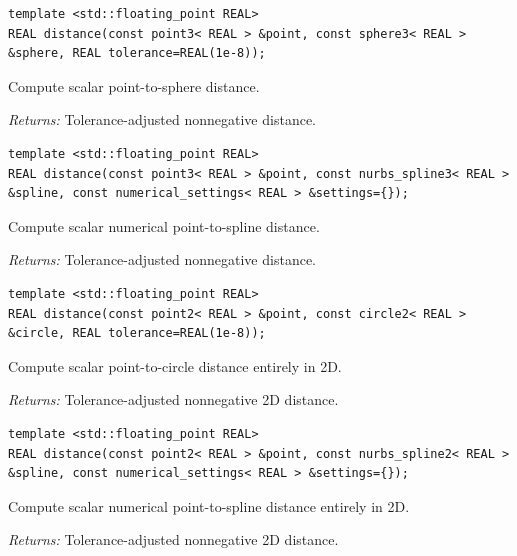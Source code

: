 \par\noindent\begin{minipage}{\linewidth}
\begin{lstlisting}[style=apireference]
template <std::floating_point REAL>
REAL distance(const point3< REAL > &point, const sphere3< REAL > &sphere, REAL tolerance=REAL(1e-8));
\end{lstlisting}
{\footnotesize Compute scalar point-to-sphere distance.\par}
{\footnotesize\textit{Returns:} Tolerance-adjusted nonnegative distance.\par}
\end{minipage}\par\vspace{1pt}
\par\noindent\begin{minipage}{\linewidth}
\begin{lstlisting}[style=apireference]
template <std::floating_point REAL>
REAL distance(const point3< REAL > &point, const nurbs_spline3< REAL > &spline, const numerical_settings< REAL > &settings={});
\end{lstlisting}
{\footnotesize Compute scalar numerical point-to-spline distance.\par}
{\footnotesize\textit{Returns:} Tolerance-adjusted nonnegative distance.\par}
\end{minipage}\par\vspace{1pt}
\par\noindent\begin{minipage}{\linewidth}
\begin{lstlisting}[style=apireference]
template <std::floating_point REAL>
REAL distance(const point2< REAL > &point, const circle2< REAL > &circle, REAL tolerance=REAL(1e-8));
\end{lstlisting}
{\footnotesize Compute scalar point-to-circle distance entirely in 2D.\par}
{\footnotesize\textit{Returns:} Tolerance-adjusted nonnegative 2D distance.\par}
\end{minipage}\par\vspace{1pt}
\par\noindent\begin{minipage}{\linewidth}
\begin{lstlisting}[style=apireference]
template <std::floating_point REAL>
REAL distance(const point2< REAL > &point, const nurbs_spline2< REAL > &spline, const numerical_settings< REAL > &settings={});
\end{lstlisting}
{\footnotesize Compute scalar numerical point-to-spline distance entirely in 2D.\par}
{\footnotesize\textit{Returns:} Tolerance-adjusted nonnegative 2D distance.\par}
\end{minipage}\par\vspace{1pt}

